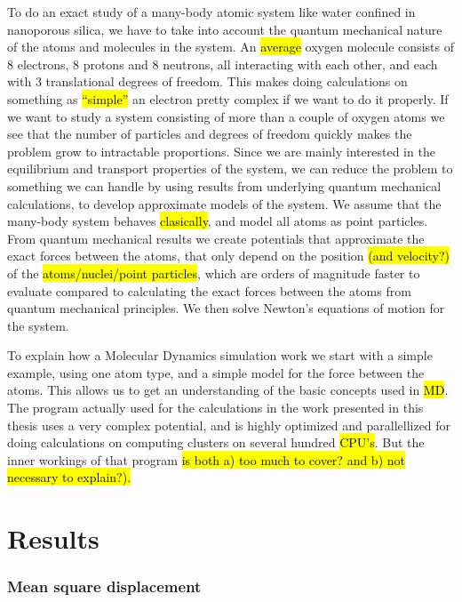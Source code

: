 \documentclass[twoside,english,a4paper]{uiofysmaster}
\begin{document}
To do an exact study of a many-body atomic system like water confined in nanoporous silica, we have to take into account the quantum mechanical nature of the atoms and molecules in the system. An \hl{average} oxygen molecule consists of 8 electrons, 8 protons and 8 neutrons, all interacting with each other, and each with 3 translational degrees of freedom. This makes doing calculations on something as \hl{``simple''} an electron pretty complex if we want to do it properly. If we want to study a system consisting of more than a couple of oxygen atoms we see that the number of particles and degrees of freedom quickly makes the problem grow to intractable proportions. Since we are mainly interested in the equilibrium and transport properties of the system, we can reduce the problem to something we can handle by using results from underlying quantum mechanical calculations, to develop approximate models of the system. We assume that the many-body system behaves \hl{clasically}, and model all atoms as point particles. From quantum mechanical results we create potentials that approximate the exact forces between the atoms, that only depend on the position \hl{(and velocity?)} of the \hl{atoms/nuclei/point particles}, which are orders of magnitude faster to evaluate compared to calculating the exact forces between the atoms from quantum mechanical principles. We then solve Newton's equations of motion for the system.

To explain how a Molecular Dynamics simulation work we start with a simple example, using one atom type, and a simple model for the force between the atoms. This allows us to get an understanding of the basic concepts used in \hl{MD}. The program actually used for the calculations in the work presented in this thesis uses a very complex potential, and is highly optimized and parallellized for doing calculations on computing clusters on several hundred \hl{CPU's}. But the inner workings of that program \hl{is both a) too much to cover? and b) not necessary to explain?).}

    



\part{Results}
    \section{Mean square displacement}
\end{document}
